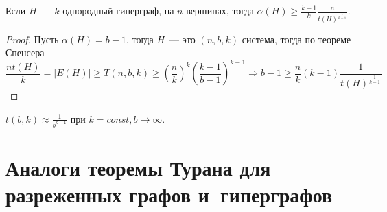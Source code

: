 \documentclass{article}
\begin{document}
\begin{claim}
	Если $H$~--- $k$-однородный гиперграф, на $n$ вершинах, тогда
	$\alpha(H) \ge \frac{k-1}{k} \frac{n}{t(H)^{\frac{1}{k-1}}}$.
\end{claim}
\begin{proof}
	Пусть $\alpha(H) = b - 1$, тогда $H$~--- это $(n,b,k)$ система, тогда по
	теореме Спенсера
	\begin{equation*}
		\frac{n t(H)}{k} = |E(H)| \ge T(n, b, k) \ge
		\left(\frac{n}{k}\right)^k \left( \frac{k-1}{b-1} \right)^{k-1} \Rightarrow
		b - 1 \ge \frac{n}{k}(k-1) \frac{1}{t(H)^{\frac{1}{k-1}}}
	\end{equation*}
\end{proof}

\begin{claim}
	$t(b, k) \approx \frac{1}{b^{k-1}}$ при $k = const, b \rightarrow \infty$.
\end{claim}

\section{Аналоги теоремы Турана для разреженных графов и~гиперграфов}
\end{document}
